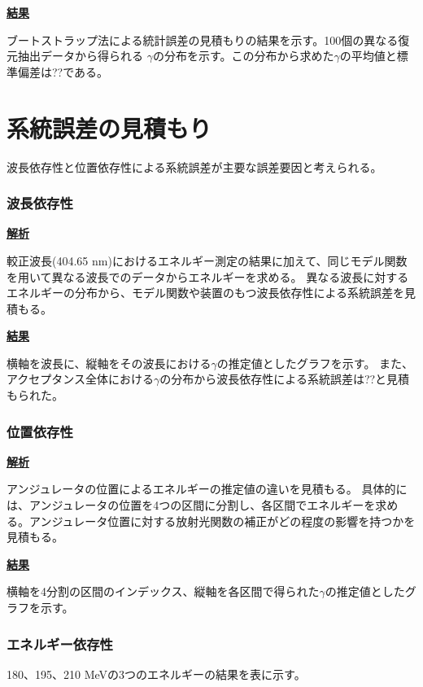 \documentclass[a4paper,11pt,uplatex]{jsbook}
\begin{document}
\noindent \textbf{\underline{結果}}\par
ブートストラップ法による統計誤差の見積もりの結果を示す。100個の異なる復元抽出データから得られる
$\gamma$の分布を示す。この分布から求めた$\gamma$の平均値と標準偏差は??である。
\section{系統誤差の見積もり}
波長依存性と位置依存性による系統誤差が主要な誤差要因と考えられる。
\subsubsection{波長依存性}
\noindent \textbf{\underline{解析}}\par
較正波長(404.65 nm)におけるエネルギー測定の結果に加えて、同じモデル関数を用いて異なる波長でのデータからエネルギーを求める。
異なる波長に対するエネルギーの分布から、モデル関数や装置のもつ波長依存性による系統誤差を見積もる。

\noindent \textbf{\underline{結果}}\par
横軸を波長に、縦軸をその波長における$\gamma$の推定値としたグラフを示す。
また、アクセプタンス全体における$\gamma$の分布から波長依存性による系統誤差は??と見積もられた。
\subsubsection{位置依存性}
\noindent \textbf{\underline{解析}}\par
アンジュレータの位置によるエネルギーの推定値の違いを見積もる。
具体的には、アンジュレータの位置を4つの区間に分割し、各区間でエネルギーを求める。アンジュレータ位置に対する放射光関数の補正がどの程度の影響を持つかを見積もる。

\noindent \textbf{\underline{結果}}\par
横軸を4分割の区間のインデックス、縦軸を各区間で得られた$\gamma$の推定値としたグラフを示す。


\subsubsection{エネルギー依存性}
180、195、210 MeVの3つのエネルギーの結果を表に示す。
\end{document}
